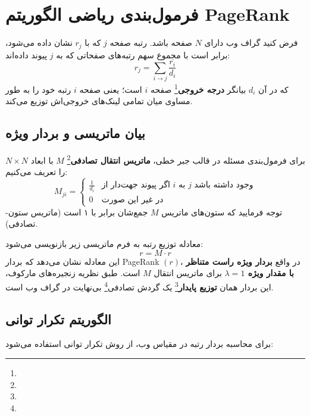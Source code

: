 \section{فرمول‌بندی ریاضی الگوریتم PageRank}

\begin{definition}
فرض کنید گراف وب دارای $N$ صفحه باشد. رتبه صفحه $j$ که با $r_j$ نشان داده می‌شود، برابر است با مجموع سهم رتبه‌های صفحاتی که به $j$ پیوند داده‌اند:
\begin{equation}
r_j = \sum_{i \to j} \frac{r_i}{d_i}
\end{equation}
که در آن $d_i$ بیانگر \textbf{درجه خروجی}\footnote{} صفحه $i$ است؛ یعنی صفحه $i$ رتبه خود را به طور مساوی میان تمامی لینک‌های خروجی‌اش توزیع می‌کند.
\end{definition}

\subsection{بیان ماتریسی و بردار ویژه}
برای فرمول‌بندی مسئله در قالب جبر خطی، \textbf{ماتریس انتقال تصادفی}\footnote{} $M$ با ابعاد $N \times N$ را تعریف می‌کنیم:
\begin{equation}
M_{ji} = 
\begin{cases}
\frac{1}{d_i} & \text{اگر پیوند جهت‌دار از } i \text{ به } j \text{ وجود داشته باشد} \\
0 & \text{در غیر این صورت}
\end{cases}
\end{equation}
توجه فرمایید که ستون‌های ماتریس $M$ جمع‌شان برابر با ۱ است (ماتریس ستون-تصادفی).

معادله توزیع رتبه به فرم ماتریسی زیر بازنویسی می‌شود:
\begin{equation}
r = M \cdot r
\end{equation}
این معادله نشان می‌دهد که بردار PageRank $(r)$، در واقع \textbf{بردار ویژه راست متناظر با مقدار ویژه $\lambda = 1$} برای ماتریس انتقال $M$ است. طبق نظریه زنجیره‌های مارکوف، این بردار همان \textbf{توزیع پایدار}\footnote{} یک گردش تصادفی\footnote{} بی‌نهایت در گراف وب است.

\subsection{الگوریتم تکرار توانی \texorpdfstring{}{(Power Iteration)}}
برای محاسبه بردار رتبه در مقیاس وب، از روش تکرار توانی استفاده می‌شود:

